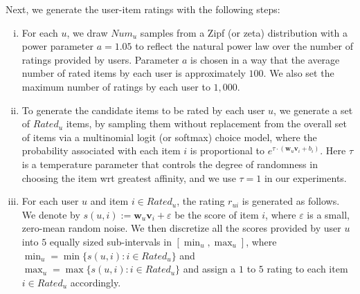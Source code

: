 \documentclass[manuscript,screen,nonacm]{acmart}
\newcommand{\1}{{\mathbf 1}}
\newcommand{\bfv}{\mathbf{v}}
\newcommand{\bfw}{\mathbf{w}}
\newcommand{\veps}{\varepsilon}
\newcommand{\NumR}{\mathit{Num}}
\newcommand{\Rated}{\mathit{Rated}}
\theoremstyle{TheoremNum}
\begin{document}
Next, we generate the user-item ratings with the following steps:
\begin{enumerate}[(i)]
\item For each $u$, we draw $\NumR_u$ samples from a Zipf (or zeta) distribution with a power parameter $a = 1.05$ to reflect the natural power law over the number of ratings provided by users. Parameter $a$ is chosen in a way that the average number of rated items by each user is approximately $100$.
We also set the maximum number of ratings by each user to $1,000$. 
\item To generate the candidate items to be rated by each user $u$, we
generate a set of $\Rated_u$ items, by sampling them without replacement from the overall set of items via a multinomial logit (or softmax) choice model, where the probability associated with each item $i$ is proportional to $e^{\tau \cdot (\bfw_u\bfv_i + b_i)}$. Here $\tau$ is a temperature parameter that controls the degree of randomness in choosing the item wrt greatest affinity, and we use $\tau = 1$ in our experiments.
\item For each user $u$ and item $i\in\Rated_u$, the rating $r_{ui}$ is generated as follows. We denote by $s(u,i):=\bfw_u\bfv_i + \veps$ be the score of item $i$, where $\veps$ is a small, zero-mean random noise. We then discretize all the scores provided by user $u$ into $5$ equally sized sub-intervals in $[\min_u, \max_u]$, where $\min_u = \min \{s(u,i): i \in\Rated_u\}$ and $\max_u = \max \{s(u,i): i \in\Rated_u\}$ and assign a $1$ to $5$ rating to each item  $i\in\Rated_u$ accordingly.
\end{enumerate}
\end{document}
